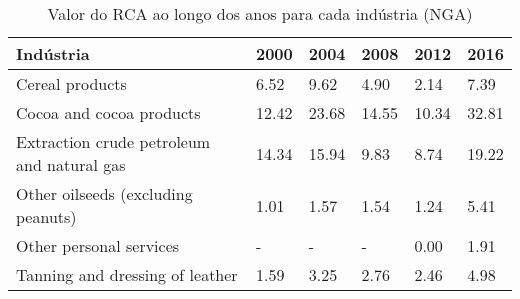 \begin{table}
\centering
\caption{Valor do RCA ao longo dos anos para cada indústria (NGA)}
\begin{tabular}{p{6cm}p{1.5cm}p{1.5cm}p{1.5cm}p{1.5cm}p{1.5cm}}
\toprule
                                 Indústria &  2000 &  2004 &  2008 &  2012 &  2016 \\
\midrule
                           Cereal products &  6.52 &  9.62 &  4.90 &  2.14 &  7.39 \\
                  Cocoa and cocoa products & 12.42 & 23.68 & 14.55 & 10.34 & 32.81 \\
Extraction crude petroleum and natural gas & 14.34 & 15.94 &  9.83 &  8.74 & 19.22 \\
        Other oilseeds (excluding peanuts) &  1.01 &  1.57 &  1.54 &  1.24 &  5.41 \\
                   Other personal services &     - &     - &     - &  0.00 &  1.91 \\
           Tanning and dressing of leather &  1.59 &  3.25 &  2.76 &  2.46 &  4.98 \\
\bottomrule
\end{tabular}
\end{table}
